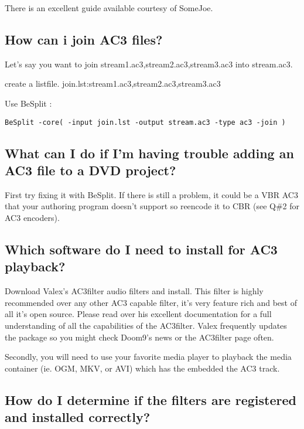 ﻿\documentclass[12pt]{article}
\begin{document}
There is an excellent guide available courtesy of SomeJoe.

\subsection{How can i join AC3 files?}

Let's say you want to join stream1.ac3,stream2.ac3,stream3.ac3 into stream.ac3.

create a listfile. join.lst:stream1.ac3,stream2.ac3,stream3.ac3

Use BeSplit :
\begin{lstlisting}
BeSplit -core( -input join.lst -output stream.ac3 -type ac3 -join )
\end{lstlisting}

\subsection{What can I do if I'm having trouble adding an AC3 file to a DVD project?}

First try fixing it with BeSplit. If there is still a problem, it could be a VBR AC3 that your
authoring program doesn't support so reencode it to CBR (see Q\#2 for AC3 encoders).

\subsection{Which software do I need to install for AC3 playback?}

Download Valex's AC3filter audio filters and install. This filter is highly recommended over any
other AC3 capable filter, it's very feature rich and best of all it's open source. Please read over
his excellent documentation for a full understanding of all the capabilities of the AC3filter. Valex
frequently updates the package so you might check Doom9's news or the AC3filter page often.

Secondly, you will need to use your favorite media player to playback the media container (ie. OGM,
MKV, or AVI) which has the embedded the AC3 track.

\subsection{How do I determine if the filters are registered and installed correctly?}
\end{document}

